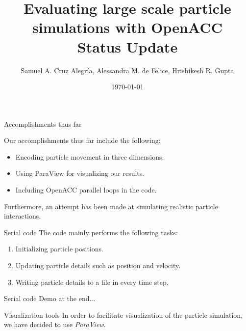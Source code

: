 \documentclass[aspectratio=169]{beamer}
\title[Particle Simulations with OpenACC]{\textbf{Evaluating large scale particle simulations with OpenACC}\\[0.5em] Status Update}
\author{Samuel A. Cruz Alegr\'{i}a, Alessandra M. de Felice, Hrishikesh R. Gupta}
\institute{(University of Lugano)}
\date{\today}
\begin{document}
\begin{frame}
\titlepage
\end{frame}

\begin{frame}[fragile]{Accomplishments thus far}

Our accomplishments thus far include the following:
%
\begin{itemize}
	\item Encoding particle movement in three dimensions.
	\item Using ParaView for visualizing our results.
	\item Including OpenACC parallel loops in the code.
\end{itemize}
%
Furthermore, an attempt has been made at simulating realistic particle interactions.

\end{frame}

\begin{frame}[fragile]{Serial code}
	The code mainly performs the following tasks:
	\begin{enumerate}
		\item Initializing particle positions.
		\item Updating particle details such as position and velocity.
		\item Writing particle details to a file in every time step.
	\end{enumerate}
\end{frame}

\begin{frame}[fragile]{Serial code}
	Demo at the end...
\end{frame}

\begin{frame}[fragile]{Visualization tools}
	In order to facilitate visualization of the particle simulation, we have decided to use \emph{ParaView}. 
\end{frame}
\end{document}
